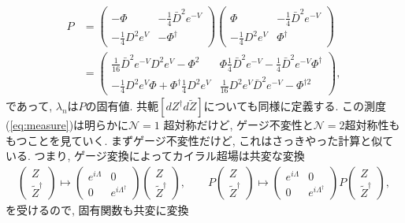 \documentclass{ltjsarticle}
\theoremstyle{definition}
\begin{document}
\begin{align}
P&=
\begin{pmatrix}
-\Phi&-\displaystyle\frac14\bar D^2e^{-V}\\[2ex]
-\displaystyle\frac14D^2e^V&-\Phi^\dagger
\end{pmatrix}
\begin{pmatrix}
\Phi&-\displaystyle\frac14\bar D^2e^{-V}\\[2ex]
-\displaystyle\frac14D^2e^V&\Phi^\dagger
\end{pmatrix}
\\&=
\begin{pmatrix}
\displaystyle\frac1{16}\bar D^2e^{-V}D^2e^V-\Phi^2&\displaystyle\Phi\frac14\bar D^2e^{-V}-\frac14\bar D^2e^{-V}\Phi^\dagger\\[2ex]
-\displaystyle\frac14D^2e^V\Phi+\Phi^\dagger\frac14D^2e^V&\displaystyle\frac1{16}D^2e^V\bar D^2e^{-V}-\Phi^{\dagger2}
\end{pmatrix},
\end{align}
であって, $\lambda_n$は$P$の固有値. 共軛$[dZ^\dagger d\tilde Z]$についても同様に定義する. この測度(\ref{eq:measure})は明らかに$\mathcal N=1$ 超対称だけど, ゲージ不変性と$\mathcal N=2$超対称性ももつことを見ていく. まずゲージ不変性だけど, これはさっきやった計算と似ている. つまり, ゲージ変換によってカイラル超場は共変な変換
\begin{align}
\begin{pmatrix}
Z\\\tilde Z^\dagger
\end{pmatrix}
\mapsto
\begin{pmatrix}
e^{i\Lambda}&0\\
0&e^{i\Lambda^\dagger}
\end{pmatrix}
\begin{pmatrix}
Z\\\tilde Z^\dagger
\end{pmatrix}
,\qquad
P
\begin{pmatrix}
Z\\\tilde Z^\dagger
\end{pmatrix}
\mapsto
\begin{pmatrix}
e^{i\Lambda}&0\\
0&e^{i\Lambda^\dagger}
\end{pmatrix}
P
\begin{pmatrix}
Z\\\tilde Z^\dagger
\end{pmatrix},
\end{align}
を受けるので, 固有関数も共変に変換
\end{document}
